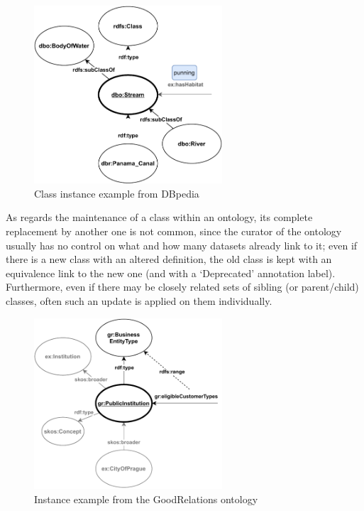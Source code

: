 \begin{figure}[h]
\centering
\includegraphics[width=7cm]{figures/conc_diag_class.pdf}
\caption{Class instance example from DBpedia}
\label{fig:conc_diag_class}
\end{figure}

As regards the maintenance of a class within an ontology, its complete replacement by another one is not common, since the curator of the ontology usually has no control on what and how many datasets already link to it; even if there is a new class with an altered definition, the old class is kept with an equivalence link to the new one (and with a `Deprecated' annotation label).
Furthermore, even if there may be closely related sets of sibling (or parent/child) classes, often such an update is applied on them individually.



\begin{figure}[h]
\centering
\includegraphics[width=7cm]{figures/conc_diag_c_ind}
\caption{Instance example from the GoodRelations ontology}
\label{fig:conc_diag_c_ind}
\end{figure}

